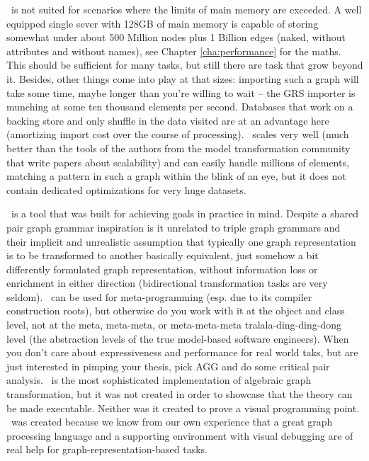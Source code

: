 \GrG\ is not suited for scenarios where the limits of main memory are exceeded.
A well equipped single sever with 128GB of main memory is capable of storing somewhat under about 500 Million nodes plus 1 Billion edges (naked, without attributes and without names), see Chapter \ref{cha:performance} for the maths.
This should be sufficient for many tasks, but still there are task that grow beyond it.
Besides, other things come into play at that sizes: importing such a graph will take some time, maybe longer than you're willing to wait -- the GRS importer is munching at some ten thousand elements per second.
Databases that work on a backing store and only shuffle in the data visited are at an advantage here (amortizing import cost over the course of processing).
\GrG\ scales very well (much better than the tools of the authors from the model transformation community that write papers about scalability) and can easily handle millions of elements, matching a pattern in such a graph within the blink of an eye, but it does not contain dedicated optimizations for very huge datasets.

\GrG\ is a tool that was built for achieving goals in practice in mind.
Despite a shared pair graph grammar inspiration is it unrelated to triple graph grammars and their implicit and unrealistic assumption that typically one graph representation is to be transformed to another basically equivalent, just somehow a bit differently formulated graph representation, without information loss or enrichment in either direction (bidirectional transformation tasks are very seldom).
\GrG\ can be used for meta-programming (esp. due to its compiler construction roots), but otherwise do you work with it at the object and class level, not at the meta, meta-meta, or meta-meta-meta tralala-ding-ding-dong level (the abstraction levels of the true model-based software engineers).
When you don't care about expressiveness and performance for real world taks, but are just interested in pimping your thesis, pick AGG and do some critical pair analysis.
\GrG\ is the most sophisticated implementation of algebraic graph transformation, but it was not created in order to showcase that the theory can be made executable.
Neither was it created to prove a visual programming point.
\GrG\ was created because we know from our own experience that a great graph processing language and a supporting environment with visual debugging are of real help for graph-representation-based tasks.
